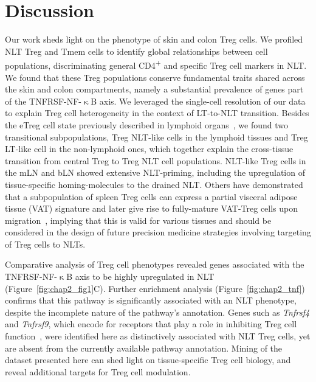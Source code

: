 \section{Discussion}
\label{section2.3}
Our work sheds light on the phenotype of skin and colon Treg cells. We profiled NLT Treg and Tmem cells to identify global relationships between cell populations, discriminating general CD4\textsuperscript{+} and specific Treg cell markers in NLT. We found that these Treg populations conserve fundamental traits shared across the skin and colon compartments, namely a substantial prevalence of genes part of the TNFRSF-NF-${\upkappa}$B axis.
We leveraged the single-cell resolution of our data to explain Treg cell heterogeneity in the context of LT-to-NLT transition. Besides the eTreg cell state previously described in lymphoid organs~\citep{Cretney2011-zd}, we found two transitional subpopulations, Treg NLT-like cells in the lymphoid tissues and Treg LT-like cell in the non-lymphoid ones, which together explain the cross-tissue transition from central Treg to Treg NLT cell populations. NLT-like Treg cells in the mLN and bLN showed extensive NLT-priming, including the upregulation of tissue-specific homing-molecules to the drained NLT. Others have demonstrated that a subpopulation of spleen Treg cells can express a partial visceral adipose tissue (VAT) signature and later give rise to fully-mature VAT-Treg cells upon migration~\citep{Li2018-xq}, implying that this is valid for various tissues and should be considered in the design of future precision medicine strategies involving targeting of Treg cells to NLTs.

Comparative analysis of Treg cell phenotypes revealed genes associated with the TNFRSF-NF-${\upkappa}$B axis to be highly upregulated in NLT (Figure~\ref{fig:chap2_fig1}C). Further enrichment analysis (Figure~\ref{fig:chap2_tnf}) confirms that this pathway is significantly associated with an NLT phenotype, despite the incomplete nature of the pathway's annotation. Genes such as \textit{Tnfrsf4} and \textit{Tnfrsf9}, which encode for receptors that play a role in inhibiting Treg cell function~\citep{nagar_tnf_2010}, were identified here as distinctively associated with NLT Treg cells, yet are absent from the currently available pathway annotation. Mining of the dataset presented here can shed light on tissue-specific Treg cell biology, and reveal additional targets for Treg cell modulation.

